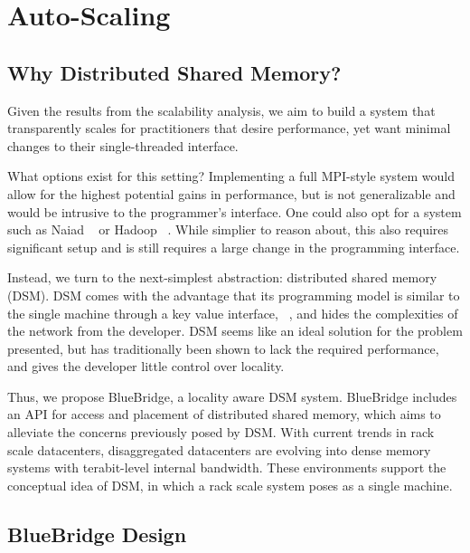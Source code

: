 \section{Auto-Scaling}
\label{sec:autoscaling}

\subsection{Why Distributed Shared Memory?}

Given the results from the scalability analysis, we aim to build a system that
transparently scales for practitioners that desire performance, yet want minimal
changes to their single-threaded interface.

What options exist for this setting? Implementing a full MPI-style system would
allow for the highest potential gains in performance, but is not generalizable
and would be intrusive to the programmer's interface. One could also opt for a system
such as Naiad ~\cite{Murray:2013:NTD:2517349.2522738} or 
Hadoop ~\cite{Vavilapalli:2013:AHY:2523616.2523633}. While simplier to reason about, 
this also requires significant setup and is still requires a large change in the 
programming interface. 

Instead, we turn to the next-simplest abstraction: distributed shared memory (DSM).
DSM comes with the advantage that its programming model is similar to the
single machine through a key value interface, ~\cite{Power:2010:PBF:1924943.1924964}, 
and hides the complexities of the network from the developer. DSM seems like an
ideal solution for the problem presented, but has traditionally been shown to lack
the required performance, and gives the developer little control over locality. 

Thus, we propose BlueBridge, a locality aware DSM system. BlueBridge includes
an API for access and placement of distributed shared memory, which aims to
alleviate the concerns previously posed by DSM. With current trends in rack
scale datacenters, disaggregated datacenters are evolving into dense memory
systems with terabit-level internal bandwidth. These environments support the 
conceptual idea of DSM, in which a rack scale system poses as a single machine. 

\subsection{BlueBridge Design}

